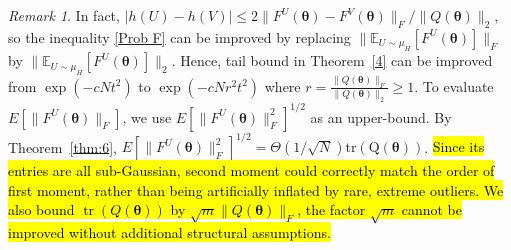 \documentclass{amsart}
\theoremstyle{plain}
\theoremstyle{definition}
\theoremstyle{remark}
\newtheorem{remark}{Remark}
\newcommand{\thmref}[1]{Theorem~\ref{#1}}
\newcommand{\EE}{\mathbb{E}}
\begin{document}
\begin{remark}
\label{remark:thm4}
  In fact, $|h(U)-h(V)|\leq 2\|F^U(\bm\theta)-F^V(\bm\theta)\|_F/\|Q(\bm\theta)\|_2$, so the inequality \eqref{Prob F} can be improved by replacing $\|\EE_{U\sim\mu_H}[F^U(\bm\theta)]\|_F$ by $\|\EE_{U\sim\mu_H}[F^U(\bm\theta)]\|_2$. Hence, tail bound in \thmref{4} can be improved from $\exp(-cNt^2)$ to $\exp(-cNr^2t^2)$ where $r=\frac{\|Q(\bm\theta)\|_F}{\|Q(\bm\theta)\|_2}\geq 1$. 
 To evaluate $E[\|F^U(\bm\theta)\|_F]$, we use $E[\|F^U(\bm\theta)\|^2_F]^{1/2}$ as an upper-bound. By \thmref{thm:6}, $E[\|F^U(\bm\theta)\|^2_F]^{1/2}=\Theta(1/\sqrt N)\operatorname{tr(Q(\bm\theta))}$. \hl{Since its entries are all sub-Gaussian, second moment could correctly match the order of first moment, rather than being artificially inflated by rare, extreme outliers. We also bound $\operatorname{tr}(Q(\bm \theta))$ by $\sqrt{m}\|Q(\bm\theta)\|_F$, the factor $\sqrt m$ cannot be improved without additional structural assumptions.} 
\end{remark}
\end{document}
